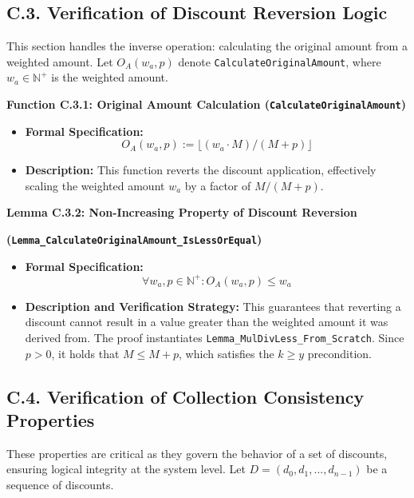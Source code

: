 \documentclass[
  english,
  onecolumn]{article}
\providecommand{\tightlist}{%
  \setlength{\itemsep}{0pt}\setlength{\parskip}{0pt}}
\begin{document}
\subsection{C.3. Verification of Discount Reversion
Logic}\label{c.3.-verification-of-discount-reversion-logic}

This section handles the inverse operation: calculating the original
amount from a weighted amount. Let \(O_A(w_a, p)\) denote
\texttt{CalculateOriginalAmount}, where \(w_a \in \mathbb{N}^+\) is the
weighted amount.

\textbf{Function C.3.1: Original Amount Calculation
(\texttt{CalculateOriginalAmount})}

\begin{itemize}
\tightlist
\item
  \textbf{Formal Specification:}
  \[ O_A(w_a, p) := \lfloor (w_a \cdot M) / (M + p) \rfloor \]
\item
  \textbf{Description:} This function reverts the discount application,
  effectively scaling the weighted amount \(w_a\) by a factor of
  \(M / (M + p)\).
\end{itemize}

\textbf{Lemma C.3.2: Non-Increasing Property of Discount Reversion}

\textbf{(\texttt{Lemma\_CalculateOriginalAmount\_IsLessOrEqual})}

\begin{itemize}
\tightlist
\item
  \textbf{Formal Specification:}
  \[ \forall w_a, p \in \mathbb{N}^+ : O_A(w_a, p) \le w_a \]
\item
  \textbf{Description and Verification Strategy:} This guarantees that
  reverting a discount cannot result in a value greater than the
  weighted amount it was derived from. The proof instantiates
  \texttt{Lemma\_MulDivLess\_From\_Scratch}. Since \(p > 0\), it holds
  that \(M \le M + p\), which satisfies the \(k \ge y\) precondition.
\end{itemize}

\subsection{C.4. Verification of Collection Consistency
Properties}\label{c.4.-verification-of-collection-consistency-properties}

These properties are critical as they govern the behavior of a set of
discounts, ensuring logical integrity at the system level. Let
\(D = (d_0, d_1, ..., d_{n-1})\) be a sequence of discounts.
\end{document}

